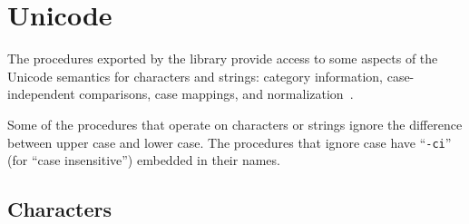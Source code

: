 \chapter{Unicode}
\label{unicodechapter}

\newcommand{\latingreek}[1]{\texonly\mathit{#1}\endtexonly\htmlonly\textit{#1}\endhtmlonly}

The procedures exported by the 
library provide access to some aspects
of the Unicode semantics for characters and strings:
category information, case-independent comparisons,
case mappings, and normalization~\cite{Unicode}.

Some of the procedures that operate on characters or strings ignore the
difference between upper case and lower case.  The procedures that
ignore case have \hbox{``{\tt -ci}''} (for ``case
insensitive'') embedded in their names.

\section{Characters}

